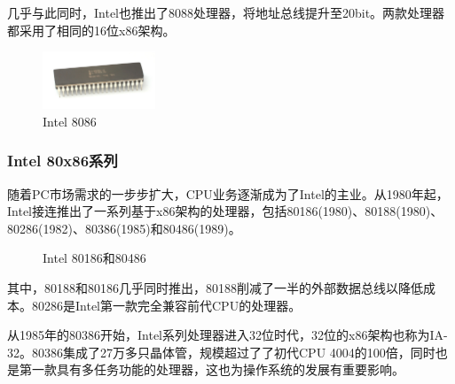 \documentclass[UTF8]{ctexart}
\begin{document}
几乎与此同时，Intel也推出了8088处理器，将地址总线提升至20bit。两款处理器都采用了相同的16位x86架构。
\begin{figure}[H]
    \begin{center}
        \includegraphics[width=0.3\textwidth]{figure/8086.jpg}
        \caption{Intel 8086}
    \end{center}
\end{figure}

\subsubsection{Intel 80x86系列}
随着PC市场需求的一步步扩大，CPU业务逐渐成为了Intel的主业。从1980年起，Intel接连推出了一系列基于x86架构的处理器，包括80186(1980)、80188(1980)、80286(1982)、80386(1985)和80486(1989)。
\begin{figure}[H]
    \centering
    \caption{Intel 80186和80486}
\end{figure}
其中，80188和80186几乎同时推出，80188削减了一半的外部数据总线以降低成本。80286是Intel第一款完全兼容前代CPU的处理器。

从1985年的80386开始，Intel系列处理器进入32位时代，32位的x86架构也称为IA-32。80386集成了27万多只晶体管，规模超过了了初代CPU 4004的100倍，同时也是第一款具有多任务功能的处理器，这也为操作系统的发展有重要影响。
\end{document}
